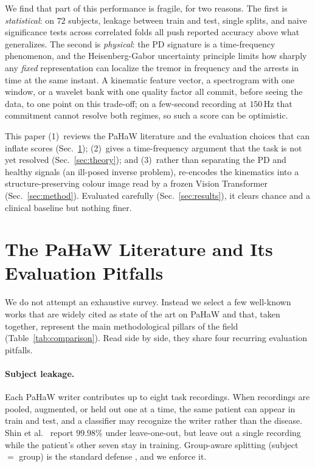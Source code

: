 \documentclass{article}
\begin{document}
We find that part of this performance is fragile, for two reasons. The first is
\emph{statistical}: on $72$ subjects, leakage between train and test, single splits,
and naive significance tests across correlated folds all push reported accuracy above
what generalizes. The second is \emph{physical}: the PD signature is a
time-frequency phenomenon, and the Heisenberg-Gabor uncertainty principle limits
how sharply any \emph{fixed} representation can localize the tremor in frequency and
the arrests in time at the same instant. A kinematic feature vector, a spectrogram
with one window, or a wavelet bank with one quality factor all commit, before seeing
the data, to one point on this trade-off; on a few-second recording at $150$\,Hz that
commitment cannot resolve both regimes, so such a score can be optimistic.

This paper (1)~reviews the PaHaW literature and the evaluation choices that can
inflate scores (Sec.~\ref{sec:lit}); (2)~gives a time-frequency argument that the
task is not yet resolved (Sec.~\ref{sec:theory}); and (3)~rather than separating the
PD and healthy signals (an ill-posed inverse problem), re-encodes the kinematics into
a structure-preserving colour image read by a frozen Vision Transformer
(Sec.~\ref{sec:method}). Evaluated carefully (Sec.~\ref{sec:results}), it clears
chance and a clinical baseline but nothing finer.

\section{The PaHaW Literature and Its Evaluation Pitfalls}
\label{sec:lit}
We do not attempt an exhaustive survey. Instead we select a few well-known works that
are widely cited as state of the art on PaHaW and that, taken together, represent the
main methodological pillars of the field (Table~\ref{tab:comparison}). Read side by
side, they share four recurring evaluation pitfalls.

\paragraph{Subject leakage.}
Each PaHaW writer contributes up to eight task recordings. When recordings are
pooled, augmented, or held out one at a time, the same patient can appear in train
and test, and a classifier may recognize the writer rather than the disease. Shin et
al.\ \citep{shin2025} report $99.98\%$ under leave-one-out, but leave out a single
recording while the patient's other seven stay in training. Group-aware splitting
(subject $=$ group) is the standard defense \citep{varma2006}, and we enforce it.
\end{document}
